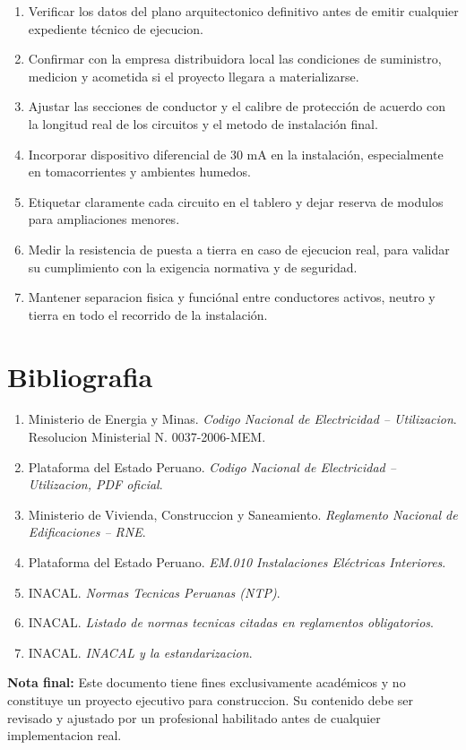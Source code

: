 \begin{enumerate}
  \item Verificar los datos del plano arquitectonico definitivo antes de emitir cualquier expediente técnico de ejecucion.
  \item Confirmar con la empresa distribuidora local las condiciones de suministro, medicion y acometida si el proyecto llegara a materializarse.
  \item Ajustar las secciones de conductor y el calibre de protección de acuerdo con la longitud real de los circuitos y el metodo de instalación final.
  \item Incorporar dispositivo diferencial de 30 mA en la instalación, especialmente en tomacorrientes y ambientes humedos.
  \item Etiquetar claramente cada circuito en el tablero y dejar reserva de modulos para ampliaciones menores.
  \item Medir la resistencia de puesta a tierra en caso de ejecucion real, para validar su cumplimiento con la exigencia normativa y de seguridad.
  \item Mantener separacion fisica y funciónal entre conductores activos, neutro y tierra en todo el recorrido de la instalación.
\end{enumerate}

\section{Bibliografia}

\begin{enumerate}
  \item Ministerio de Energia y Minas. \textit{Codigo Nacional de Electricidad -- Utilizacion}. Resolucion Ministerial N. 0037-2006-MEM.
  \item Plataforma del Estado Peruano. \textit{Codigo Nacional de Electricidad -- Utilizacion, PDF oficial}.
  \item Ministerio de Vivienda, Construccion y Saneamiento. \textit{Reglamento Nacional de Edificaciones -- RNE}.
  \item Plataforma del Estado Peruano. \textit{EM.010 Instalaciones Eléctricas Interiores}.
  \item INACAL. \textit{Normas Tecnicas Peruanas (NTP)}.
  \item INACAL. \textit{Listado de normas tecnicas citadas en reglamentos obligatorios}.
  \item INACAL. \textit{INACAL y la estandarizacion}.
\end{enumerate}

\bigskip

\noindent\textbf{Nota final:} Este documento tiene fines exclusivamente académicos y no constituye un proyecto ejecutivo para construccion. Su contenido debe ser revisado y ajustado por un profesional habilitado antes de cualquier implementacion real.
